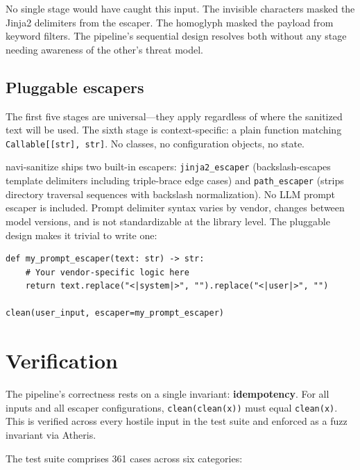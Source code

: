 \documentclass[11pt,letterpaper]{article}
\begin{document}
No single stage would have caught this input. The invisible characters masked the Jinja2 delimiters from the escaper. The homoglyph masked the payload from keyword filters. The pipeline's sequential design resolves both without any stage needing awareness of the other's threat model.

\subsection{Pluggable escapers}

The first five stages are universal---they apply regardless of where the sanitized text will be used. The sixth stage is context-specific: a plain function matching \texttt{Callable[[str],~str]}. No classes, no configuration objects, no state.

navi-sanitize ships two built-in escapers: \texttt{jinja2\_escaper} (backslash-escapes template delimiters including triple-brace edge cases) and \texttt{path\_escaper} (strips directory traversal sequences with backslash normalization). No LLM prompt escaper is included. Prompt delimiter syntax varies by vendor, changes between model versions, and is not standardizable at the library level. The pluggable design makes it trivial to write one:

\begin{lstlisting}
def my_prompt_escaper(text: str) -> str:
    # Your vendor-specific logic here
    return text.replace("<|system|>", "").replace("<|user|>", "")

clean(user_input, escaper=my_prompt_escaper)
\end{lstlisting}


\section{Verification}

The pipeline's correctness rests on a single invariant: \textbf{idempotency}. For all inputs and all escaper configurations, \texttt{clean(clean(x))} must equal \texttt{clean(x)}. This is verified across every hostile input in the test suite and enforced as a fuzz invariant via Atheris.

The test suite comprises 361 cases across six categories:
\end{document}
